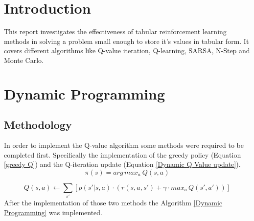 \documentclass{article}
\begin{document}


\section*{Introduction}
This report investigates the effectiveness of tabular reinforcement learning methods in solving a problem small enough to store it's values in tabular form.
It covers different algorithms like Q-value iteration, Q-learning, SARSA, N-Step and Monte Carlo.
\section{Dynamic Programming} \label{sec:Dynamic}
\subsection{Methodology}
In order to implement the Q-value algorithm some methods were required to be completed first.
Specifically the implementation of the greedy policy (Equation \ref{greedy Q}) and the Q-iteration update (Equation \ref{Dynamic Q Value update}).
\begin{equation}
    \label{greedy Q}
    \pi(s) = arg\,max_a\ Q(s,a)
\end{equation}

\begin{equation}
    \label{Dynamic Q Value update}
    Q(s,a) \leftarrow \sum_{s'}[p(s'|s,a) \cdot (r(s,a,s') + \gamma \cdot max_a\,Q(s',a') )]
\end{equation}
After the implementation of those two methods the Algorithm \ref{Dynamic Programming} was implemented.
 
\end{document}
